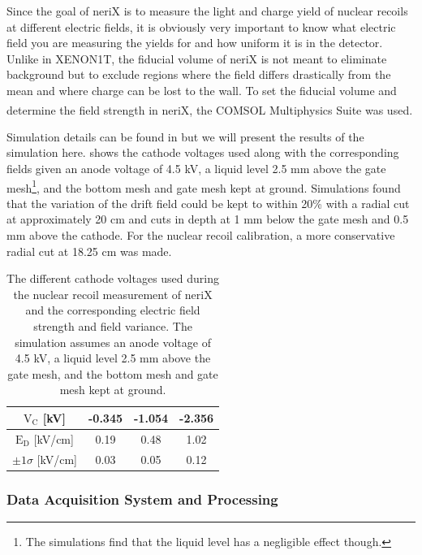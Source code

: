 Since the goal of neriX is to measure the light and charge yield of nuclear recoils at different electric fields, it is obviously very important to know what electric field you are measuring the yields for and how uniform it is in the detector.  Unlike in XENON1T, the fiducial volume of neriX is not meant to eliminate background but to exclude regions where the field differs drastically from the mean and where charge can be lost to the wall.  To set the fiducial volume and determine the field strength in neriX, the COMSOL Multiphysics\textsuperscript{\textregistered} Suite was used.  

Simulation details can be found in  but we will present the results of the simulation here.   shows the cathode voltages used along with the corresponding fields given an anode voltage of 4.5 kV, a liquid level 2.5 mm above the gate mesh\footnote{The simulations find that the liquid level has a negligible effect though.}, and the bottom mesh and gate mesh kept at ground.  Simulations found that the variation of the drift field could be kept to within 20\% with a radial cut at approximately 20 cm and cuts in depth at 1 mm below the gate mesh and 0.5 mm above the cathode.  For the nuclear recoil calibration, a more conservative radial cut at 18.25 cm was made.  

\begin{table}[t]
\centering
\def\arraystretch{1.3}
\begin{tabular}{c|ccc}
$\textrm{V}_{\textrm{C}}$ [kV] & -0.345 & -1.054 & -2.356 \\
\hline
$\textrm{E}_{\textrm{D}}$ [kV/cm] & 0.19 & 0.48 & 1.02 \\ 
$\pm 1\sigma$ [kV/cm] & 0.03 & 0.05 & 0.12 \\ 
\end{tabular}
\caption{The different cathode voltages used during the nuclear recoil measurement of neriX and the corresponding electric field strength and field variance.  The simulation assumes an anode voltage of 4.5 kV, a liquid level 2.5 mm above the gate mesh, and the bottom mesh and gate mesh kept at ground.}
\label{tab:nerix_electric_fields}
\end{table}



\subsubsection{Data Acquisition System and Processing}

